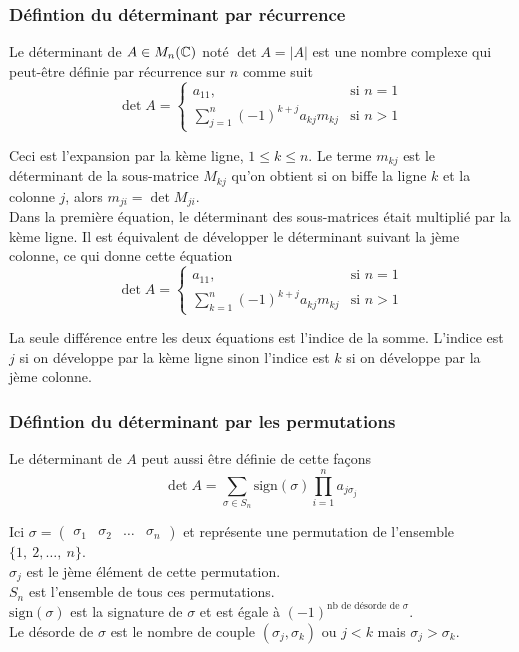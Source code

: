 \subsubsection{Défintion du déterminant par récurrence}
\begin{definition}
    Le déterminant de $A \in M_n(\mathbb{C})$ noté $\det A = |A|$ est une nombre complexe
    qui peut-être définie par récurrence sur $n$ comme suit \[
        \det A = \begin{cases}
            a_{11},                                   & \text{si } n = 1 \\
            \sum_{j = 1}^{n} (-1)^{k + j}a_{kj}m_{kj} & \text{si } n > 1
        \end{cases}
    \]
\end{definition}
Ceci est l'expansion par la kème ligne, $1 \leq k \leq n$. Le terme $m_{kj}$
est le déterminant de la sous-matrice $M_{kj}$ qu'on obtient si on biffe la ligne $k$ et la
colonne $j$, alors $m_{ji} = \det M_{ji}$. \\
Dans la première équation, le déterminant des sous-matrices était multiplié par la kème ligne. Il est
équivalent de développer le déterminant suivant la jème colonne, ce qui donne cette équation \[
    \det A = \begin{cases}
        a_{11},                                   & \text{si } n = 1 \\
        \sum_{k = 1}^{n} (-1)^{k + j}a_{kj}m_{kj} & \text{si } n > 1
    \end{cases}
\]
\begin{remark}
    La seule différence entre les deux équations est l'indice de la somme. L'indice est $j$ si on
    développe par la kème ligne sinon l'indice est $k$ si on développe par la jème colonne.
\end{remark}

\subsubsection{Défintion du déterminant par les permutations}
\begin{definition}
    Le déterminant de $A$ peut aussi être définie de cette façons \begin{equation*}
        \det A = \sum_{\sigma \in S_n} \text{sign}(\sigma) \prod_{i = 1}^{n}a_{j \sigma_j}
    \end{equation*}
\end{definition}
Ici $\sigma = \begin{pmatrix}
        \sigma_1 & \sigma_2 & \dots & \sigma_n
    \end{pmatrix}$ et représente une permutation de l'ensemble $\{1, \ 2, \dots, \ n  \}$. \\
$\sigma_j$ est le jème élément de cette permutation. \\
$S_n$ est l'ensemble de tous ces permutations. \\
$\text{sign}(\sigma)$ est la signature de $\sigma$ et est égale à $(-1)^{\text{nb de désorde de } \sigma}$. \\
Le désorde de $\sigma$ est le nombre de couple $(\sigma_j, \sigma_k)$ ou $j < k$ mais $\sigma_j > \sigma_k$.

